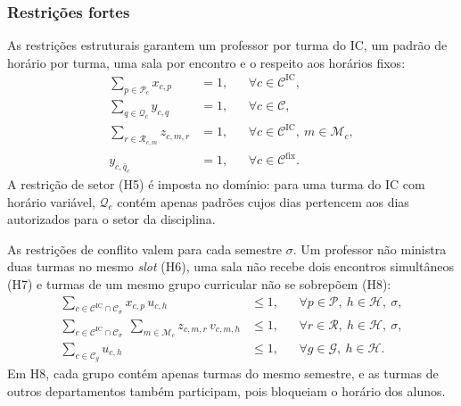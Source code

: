 \subsubsection{Restrições fortes}

As restrições estruturais garantem um professor por turma do IC, um padrão de horário por turma, uma sala por encontro e o respeito aos horários fixos:
\begin{align}
  \sum_{p\in\mathcal{P}_c} x_{c,p} &= 1, && \forall c\in\mathcal{C}^{\mathrm{IC}}, \tag{H1}\\
  \sum_{q\in\mathcal{Q}_c} y_{c,q} &= 1, && \forall c\in\mathcal{C}, \tag{H2}\\
  \sum_{r\in\mathcal{R}_{c,m}} z_{c,m,r} &= 1, && \forall c\in\mathcal{C}^{\mathrm{IC}},\ m\in\mathcal{M}_c, \tag{H3}\\
  y_{c,\bar q_c} &= 1, && \forall c\in\mathcal{C}^{\mathrm{fix}}. \tag{H4}
\end{align}
A restrição de setor (H5) é imposta no domínio: para uma turma do IC com horário variável, $\mathcal{Q}_c$ contém apenas padrões cujos dias pertencem aos dias autorizados para o setor da disciplina.

As restrições de conflito valem para cada semestre $\sigma$. Um professor não ministra duas turmas no mesmo \textit{slot} (H6), uma sala não recebe dois encontros simultâneos (H7) e turmas de um mesmo grupo curricular não se sobrepõem (H8):
\begin{align}
  \sum_{c\in\mathcal{C}^{\mathrm{IC}}\cap\mathcal{C}_\sigma} x_{c,p}\,u_{c,h} &\leq 1, && \forall p\in\mathcal{P},\ h\in\mathcal{H},\ \sigma, \tag{H6}\\
  \sum_{c\in\mathcal{C}^{\mathrm{IC}}\cap\mathcal{C}_\sigma}\ \sum_{m\in\mathcal{M}_c} z_{c,m,r}\,v_{c,m,h} &\leq 1, && \forall r\in\mathcal{R},\ h\in\mathcal{H},\ \sigma, \tag{H7}\\
  \sum_{c\in\mathcal{C}_g} u_{c,h} &\leq 1, && \forall g\in\mathcal{G},\ h\in\mathcal{H}. \tag{H8}
\end{align}
Em H8, cada grupo contém apenas turmas do mesmo semestre, e as turmas de outros departamentos também participam, pois bloqueiam o horário dos alunos.

